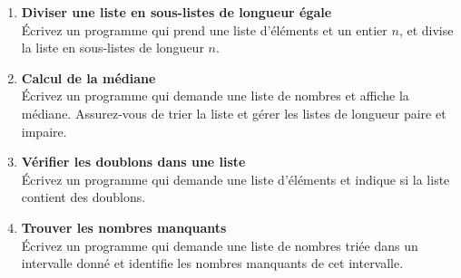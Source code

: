 \begin{enumerate}
    \item \textbf{Diviser une liste en sous-listes de longueur égale} \\
    Écrivez un programme qui prend une liste d'éléments et un entier $n$, et divise la liste en sous-listes de longueur $n$.

    \item \textbf{Calcul de la médiane} \\
    Écrivez un programme qui demande une liste de nombres et affiche la médiane. Assurez-vous de trier la liste et gérer les listes de longueur paire et impaire.

    \item \textbf{Vérifier les doublons dans une liste} \\
    Écrivez un programme qui demande une liste d'éléments et indique si la liste contient des doublons.

    \item \textbf{Trouver les nombres manquants} \\
    Écrivez un programme qui demande une liste de nombres triée dans un intervalle donné et identifie les nombres manquants de cet intervalle.
    
\end{enumerate}

